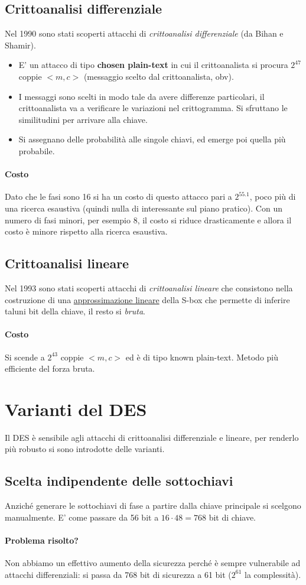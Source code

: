 \subsection{Crittoanalisi differenziale} Nel 1990 sono stati scoperti attacchi di \emph{crittoanalisi differenziale} (da Bihan e Shamir).
\begin{itemize}
	\item E' un attacco di tipo \textbf{chosen plain-text} in cui il crittoanalista si procura $2^{47}$ coppie $<m,c>$ (messaggio scelto dal crittoanalista, obv).
	\item I messaggi sono scelti in modo tale da avere differenze particolari, il crittoanalista va a verificare le variazioni nel crittogramma. Si sfruttano le similitudini per arrivare alla chiave.
	\item Si assegnano delle probabilità alle singole chiavi, ed emerge poi quella più probabile.
\end{itemize}
\paragraph{Costo} Dato che le fasi sono 16 si ha un costo di questo attacco pari a $2^{55.1}$, poco più di una ricerca esaustiva (quindi nulla di interessante sul piano pratico). Con un numero di fasi minori, per esempio $8$, il costo si riduce drasticamente e allora il costo è minore rispetto alla ricerca esaustiva.

\subsection{Crittoanalisi lineare} Nel 1993 sono stati scoperti attacchi di \emph{crittoanalisi lineare} che consistono nella costruzione di una \underline{approssimazione lineare} della S-box che permette di inferire taluni bit della chiave, il resto si \textit{bruta}.
\paragraph{Costo} Si scende a $2^{43}$ coppie $<m, c>$ ed è di tipo known plain-text. Metodo più efficiente del forza bruta.

\section{Varianti del DES}
Il DES è sensibile agli attacchi di crittoanalisi differenziale e lineare, per renderlo più robusto si sono introdotte delle varianti. 
\subsection{Scelta indipendente delle sottochiavi}
Anziché generare le sottochiavi di fase a partire dalla chiave principale si scelgono manualmente.
E' come passare da 56 bit a $16 \cdot 48 = 768$ bit di chiave. \paragraph{Problema risolto?} Non abbiamo un effettivo aumento della sicurezza perché è sempre vulnerabile ad attacchi differenziali: si passa da 768 bit di sicurezza a 61 bit ($2^{61}$ la complessità).

